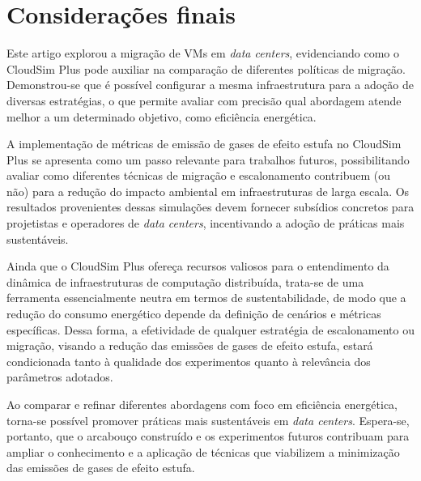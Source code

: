 \documentclass[12pt]{article}
\begin{document}
\section{Considerações finais}

Este artigo explorou a migração de VMs em \textit{data centers}, evidenciando como o CloudSim Plus pode auxiliar na comparação de diferentes políticas de migração. Demonstrou-se que é possível configurar a mesma infraestrutura para a adoção de diversas estratégias, o que permite avaliar com precisão qual abordagem atende melhor a um determinado objetivo, como eficiência energética.

A implementação de métricas de emissão de gases de efeito estufa no CloudSim Plus se apresenta como um passo relevante para trabalhos futuros, possibilitando avaliar como diferentes técnicas de migração e escalonamento contribuem (ou não) para a redução do impacto ambiental em infraestruturas de larga escala. Os resultados provenientes dessas simulações devem fornecer subsídios concretos para projetistas e operadores de \textit{data centers}, incentivando a adoção de práticas mais sustentáveis.

Ainda que o CloudSim Plus ofereça recursos valiosos para o entendimento da dinâmica de infraestruturas de computação distribuída, trata-se de uma ferramenta essencialmente neutra em termos de sustentabilidade, de modo que a redução do consumo energético depende da definição de cenários e métricas específicas. Dessa forma, a efetividade de qualquer estratégia de escalonamento ou migração, visando a redução das emissões de gases de efeito estufa, estará condicionada tanto à qualidade dos experimentos quanto à relevância dos parâmetros adotados.

Ao comparar e refinar diferentes abordagens com foco em eficiência energética, torna-se possível promover práticas mais sustentáveis em \textit{data centers}. Espera-se, portanto, que o arcabouço construído e os experimentos futuros contribuam para ampliar o conhecimento e a aplicação de técnicas que viabilizem a minimização das emissões de gases de efeito estufa.

\renewcommand{\refname}{Referências}


\end{document}
